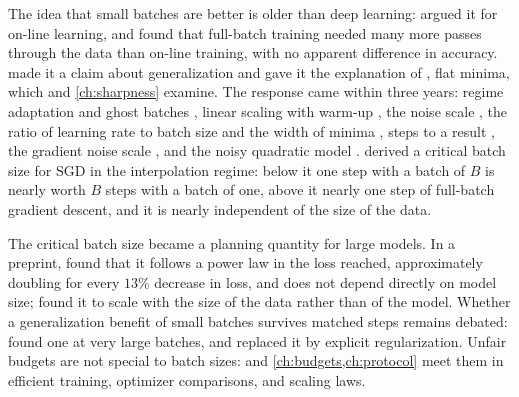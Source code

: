 \begin{refsection}
\notesandrefs
The idea that small batches are better is older than deep learning: \textcite{LeCunEtAl1998} argued it for on-line learning, and \textcite{WilsonMartinez2003} found that full-batch training needed many more passes through the data than on-line training, with no apparent difference in accuracy. \Textcite{KeskarEtAl2017} made it a claim about generalization and gave it the explanation of \textcite{HochreiterSchmidhuber1997}, flat minima, which \textcite{DinhEtAl2017} and \cref{ch:sharpness} examine. The response came within three years: regime adaptation and ghost batches \parencite{HofferEtAl2017}, linear scaling with warm-up \parencite{GoyalEtAl2017}, the noise scale \parencite{SmithLe2018,SmithEtAl2018}, the ratio of learning rate to batch size and the width of minima \parencite{JastrzebskiEtAl2018}, steps to a result \parencite{ShallueEtAl2019}, the gradient noise scale \parencite{McCandlishEtAl2018}, and the noisy quadratic model \parencite{ZhangEtAl2019}. \Textcite{MaBassilyBelkin2018} derived a critical batch size for SGD in the interpolation regime: below it one step with a batch of $B$ is nearly worth $B$ steps with a batch of one, above it nearly one step of full-batch gradient descent, and it is nearly independent of the size of the data.

The critical batch size became a planning quantity for large models. In a preprint, \textcite{KaplanEtAl2020} found that it follows a power law in the loss reached, approximately doubling for every $13\%$ decrease in loss, and does not depend directly on model size; \textcite{ZhangEtAl2025} found it to scale with the size of the data rather than of the model. Whether a generalization benefit of small batches survives matched steps remains debated: \textcite{SmithElsenDe2020} found one at very large batches, and \textcite{GeipingEtAl2022} replaced it by explicit regularization. Unfair budgets are not special to batch sizes: \textcite{KaddourEtAl2023} and \cref{ch:budgets,ch:protocol} meet them in efficient training, optimizer comparisons, and scaling laws.


\end{refsection}
